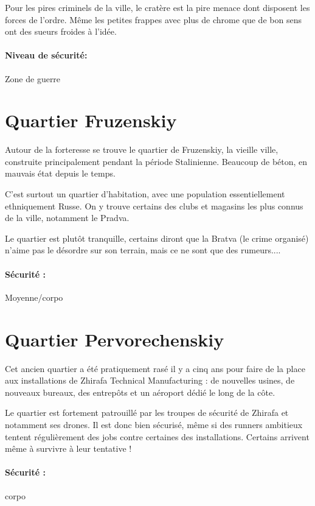 \documentclass[10pt,a4paper]{book}
\begin{document}
Pour les pires criminels de la ville, le cratère est la pire menace dont disposent les forces de l'ordre. Même les petites frappes avec plus de chrome que de bon sens ont des sueurs froides à l'idée.
\paragraph{Niveau de sécurité:}Zone de guerre

\section{Quartier Fruzenskiy}
Autour de la forteresse se trouve le quartier de Fruzenskiy, la vieille ville, construite principalement pendant la période Stalinienne. Beaucoup de béton, en mauvais état depuis le temps.

C'est surtout un quartier d'habitation, avec une population essentiellement ethniquement Russe. On y trouve certains des clubs et magasins les plus connus de la ville, notamment le Pradva.

Le quartier est plutôt tranquille, certains diront que la Bratva (le crime organisé) n'aime pas le désordre sur son terrain, mais ce ne sont que des rumeurs....
\paragraph{Sécurité :}Moyenne/corpo
\section{Quartier Pervorechenskiy}
Cet ancien quartier a été pratiquement rasé il y a cinq ans pour faire de la place aux installations de Zhirafa Technical Manufacturing : de nouvelles usines, de nouveaux bureaux, des entrepôts et un aéroport dédié le long de la côte.

Le quartier est fortement patrouillé par les troupes de sécurité de Zhirafa et notamment ses drones. Il est donc bien sécurisé, même si des runners ambitieux tentent régulièrement des jobs contre certaines des installations. Certains arrivent même à survivre à leur tentative !
\paragraph{Sécurité :}corpo
\end{document}
